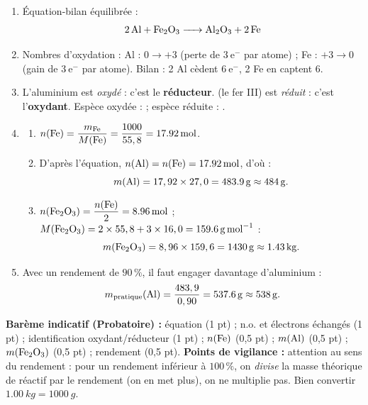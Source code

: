 \documentclass[11pt]{article}
\begin{document}
\begin{corrige}
\begin{enumerate}
\item Équation-bilan équilibrée :
\[ \ce{2 Al + Fe2O3 -> Al2O3 + 2 Fe} \]
\item Nombres d'oxydation : Al : $0 \to +3$ (perte de $3\ \text{e}^-$ par atome) ; Fe : $+3 \to 0$ (gain de $3\ \text{e}^-$ par atome). Bilan : 2 Al cèdent $6\ \text{e}^-$, 2 Fe en captent $6$.
\item L'aluminium est \emph{oxydé} : c'est le \textbf{réducteur}.  (le fer III) est \emph{réduit} : c'est l'\textbf{oxydant}. Espèce oxydée :  ; espèce réduite : .
\item 
\begin{enumerate}
\item $n(\ce{Fe}) = \dfrac{m_{\ce{Fe}}}{M(\ce{Fe})} = \dfrac{\num{1000}}{55,8} = \SI{17,92}{mol}$.
\item D'après l'équation, $n(\ce{Al}) = n(\ce{Fe}) = \SI{17,92}{mol}$, d'où :
\[ m(\ce{Al}) = 17,92 \times 27,0 = \SI{483,9}{g} \approx \SI{484}{g}. \]
\item $n(\ce{Fe2O3}) = \dfrac{n(\ce{Fe})}{2} = \SI{8,96}{mol}$ ; $M(\ce{Fe2O3}) = 2 \times 55,8 + 3 \times 16,0 = \SI{159,6}{g.mol^{-1}}$ :
\[ m(\ce{Fe2O3}) = 8,96 \times 159,6 = \SI{1430}{g} \approx \SI{1,43}{kg}. \]
\end{enumerate}
\item Avec un rendement de $90\,\%$, il faut engager davantage d'aluminium :
\[ m_{\text{pratique}}(\ce{Al}) = \dfrac{483,9}{0,90} = \SI{537,6}{g} \approx \SI{538}{g}. \]
\end{enumerate}
\textbf{Barème indicatif (Probatoire) :} équation (1 pt) ; n.o. et électrons échangés (1 pt) ; identification oxydant/réducteur (1 pt) ; $n(\ce{Fe})$ (0,5 pt) ; $m(\ce{Al})$ (0,5 pt) ; $m(\ce{Fe2O3})$ (0,5 pt) ; rendement (0,5 pt).
\textbf{Points de vigilance :} attention au sens du rendement : pour un rendement inférieur à $100\,\%$, on \emph{divise} la masse théorique de réactif par le rendement (on en met plus), on ne multiplie pas. Bien convertir $\SI{1,00}{kg} = \SI{1000}{g}$.
\end{corrige}
\end{document}
